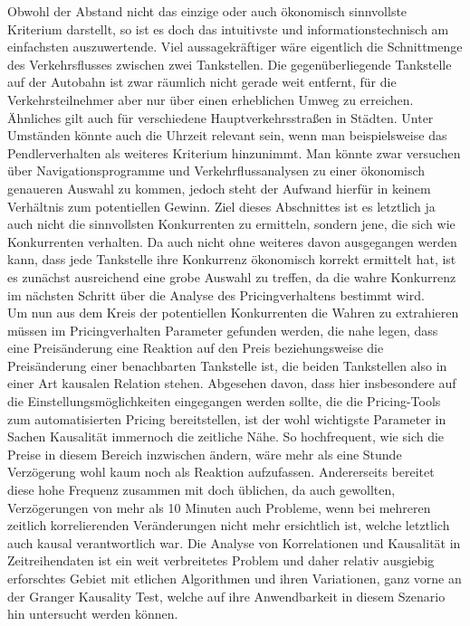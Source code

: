 \documentclass[12pt,a4paper,bibliography=totocnumbered,listof=totocnumbered]{scrartcl}
\begin{document}
Obwohl der Abstand nicht das einzige oder auch ökonomisch sinnvollste Kriterium darstellt, so ist es doch das intuitivste und informationstechnisch am einfachsten auszuwertende. Viel aussagekräftiger wäre eigentlich die Schnittmenge des Verkehrsflusses zwischen zwei Tankstellen. Die gegenüberliegende Tankstelle auf der Autobahn ist zwar räumlich nicht gerade  weit entfernt, für die Verkehrsteilnehmer aber nur über einen erheblichen Umweg zu erreichen. Ähnliches gilt auch für verschiedene Hauptverkehrsstraßen in Städten. Unter Umständen könnte auch die Uhrzeit relevant sein, wenn man beispielsweise das Pendlerverhalten als weiteres Kriterium hinzunimmt. Man könnte zwar versuchen über Navigationsprogramme und Verkehrflussanalysen zu einer ökonomisch genaueren Auswahl zu kommen, jedoch steht der Aufwand hierfür in keinem Verhältnis zum potentiellen Gewinn. Ziel dieses Abschnittes ist es letztlich ja auch nicht die sinnvollsten Konkurrenten zu ermitteln, sondern jene, die sich wie Konkurrenten verhalten. Da auch nicht ohne weiteres davon ausgegangen werden kann, dass jede Tankstelle ihre Konkurrenz ökonomisch korrekt ermittelt hat, ist es zunächst ausreichend eine grobe Auswahl zu treffen, da die wahre Konkurrenz im nächsten Schritt über die Analyse des Pricingverhaltens bestimmt wird.\\

Um nun aus dem Kreis der potentiellen Konkurrenten die Wahren zu extrahieren müssen im Pricingverhalten Parameter gefunden werden, die nahe legen, dass eine Preisänderung eine Reaktion auf den Preis beziehungsweise die Preisänderung einer benachbarten Tankstelle ist, die beiden Tankstellen also in einer Art kausalen Relation stehen. Abgesehen davon, dass hier insbesondere auf die Einstellungsmöglichkeiten eingegangen werden sollte, die die Pricing-Tools zum automatisierten Pricing bereitstellen, ist der wohl wichtigste Parameter in Sachen Kausalität immernoch die zeitliche Nähe. So hochfrequent, wie sich die Preise in diesem Bereich inzwischen ändern, wäre mehr als eine Stunde Verzögerung wohl kaum noch als Reaktion aufzufassen. Andererseits bereitet diese hohe Frequenz zusammen mit doch üblichen, da auch gewollten, Verzögerungen von mehr als 10 Minuten auch Probleme, wenn bei mehreren zeitlich korrelierenden Veränderungen nicht mehr ersichtlich ist, welche letztlich auch kausal verantwortlich war. Die Analyse von Korrelationen und Kausalität in Zeitreihendaten ist ein weit verbreitetes Problem und daher relativ ausgiebig erforschtes Gebiet mit etlichen Algorithmen und ihren Variationen, ganz vorne an der Granger Kausality Test, welche auf ihre Anwendbarkeit in diesem Szenario hin untersucht werden können.\\
\end{document}
